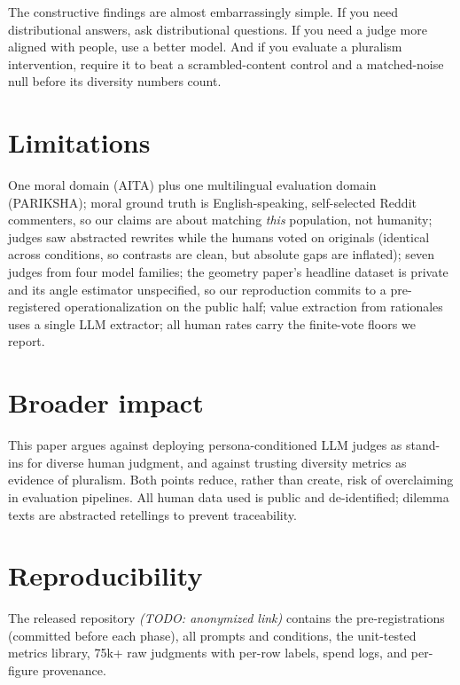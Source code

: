 \documentclass{article}
\begin{document}
The constructive findings are almost embarrassingly simple. If you need distributional answers, ask distributional questions. If you need a judge more aligned with people, use a better model. And if you evaluate a pluralism intervention, require it to beat a scrambled-content control and a matched-noise null before its diversity numbers count.

\section{Limitations}

One moral domain (AITA) plus one multilingual evaluation domain (PARIKSHA); moral ground truth is English-speaking, self-selected Reddit commenters, so our claims are about matching \emph{this} population, not humanity; judges saw abstracted rewrites while the humans voted on originals (identical across conditions, so contrasts are clean, but absolute gaps are inflated); seven judges from four model families; the geometry paper's headline dataset is private and its angle estimator unspecified, so our reproduction commits to a pre-registered operationalization on the public half; value extraction from rationales uses a single LLM extractor; all human rates carry the finite-vote floors we report.

\section*{Broader impact}

This paper argues against deploying persona-conditioned LLM judges as stand-ins for diverse human judgment, and against trusting diversity metrics as evidence of pluralism. Both points reduce, rather than create, risk of overclaiming in evaluation pipelines. All human data used is public and de-identified; dilemma texts are abstracted retellings to prevent traceability.

\section*{Reproducibility}

The released repository \emph{(TODO: anonymized link)} contains the pre-registrations (committed before each phase), all prompts and conditions, the unit-tested metrics library, 75k+ raw judgments with per-row labels, spend logs, and per-figure provenance.



\end{document}
